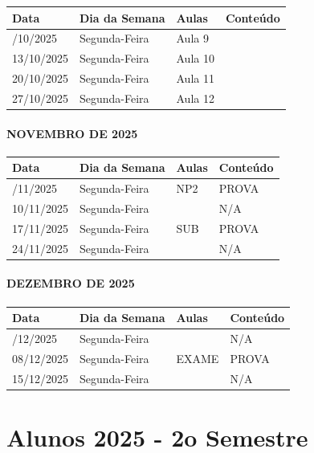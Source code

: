 \documentclass[
]{book}
\begin{document}
\begin{longtable}[]{@{}llll@{}}
\toprule\noalign{}
Data & Dia da Semana & Aulas & Conteúdo \\
\midrule\noalign{}
\endhead
\bottomrule\noalign{}
\endlastfoot
06/10/2025 & Segunda-Feira & Aula 9 & \\
13/10/2025 & Segunda-Feira & Aula 10 & \\
20/10/2025 & Segunda-Feira & Aula 11 & \\
27/10/2025 & Segunda-Feira & Aula 12 & \\
\end{longtable}

\paragraph{NOVEMBRO DE 2025}\label{novembro-de-2025}

\begin{longtable}[]{@{}llll@{}}
\toprule\noalign{}
Data & Dia da Semana & Aulas & Conteúdo \\
\midrule\noalign{}
\endhead
\bottomrule\noalign{}
\endlastfoot
03/11/2025 & Segunda-Feira & NP2 & PROVA \\
10/11/2025 & Segunda-Feira & & N/A \\
17/11/2025 & Segunda-Feira & SUB & PROVA \\
24/11/2025 & Segunda-Feira & & N/A \\
\end{longtable}

\paragraph{DEZEMBRO DE 2025}\label{dezembro-de-2025}

\begin{longtable}[]{@{}llll@{}}
\toprule\noalign{}
Data & Dia da Semana & Aulas & Conteúdo \\
\midrule\noalign{}
\endhead
\bottomrule\noalign{}
\endlastfoot
01/12/2025 & Segunda-Feira & & N/A \\
08/12/2025 & Segunda-Feira & EXAME & PROVA \\
15/12/2025 & Segunda-Feira & & N/A \\
\end{longtable}

\section{Alunos 2025 - 2o Semestre}\label{alunos-2025---2o-semestre}
\end{document}
